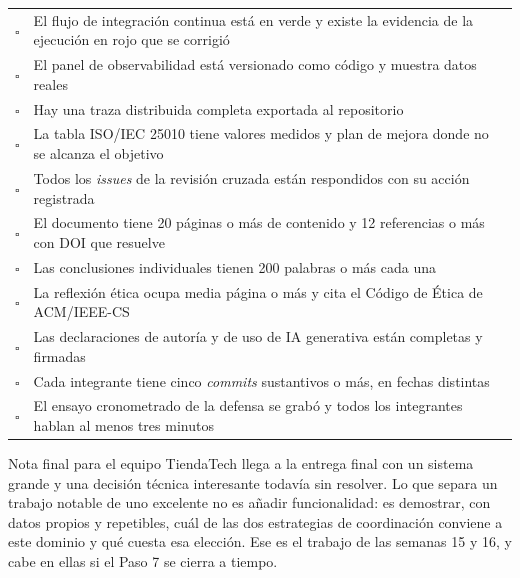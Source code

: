 \documentclass[11pt,a4paper]{article}
\begin{document}
\begin{center}
\begin{longtable}{@{}p{0.7cm}p{14.2cm}@{}}
			$\square$ & El flujo de integración continua está en verde y existe la evidencia de la ejecución en rojo que se corrigió \\
			$\square$ & El panel de observabilidad está versionado como código y muestra datos reales \\
			$\square$ & Hay una traza distribuida completa exportada al repositorio \\
			$\square$ & La tabla ISO/IEC 25010 tiene valores medidos y plan de mejora donde no se alcanza el objetivo \\
			$\square$ & Todos los \emph{issues} de la revisión cruzada están respondidos con su acción registrada \\
			$\square$ & El documento tiene 20 páginas o más de contenido y 12 referencias o más con DOI que resuelve \\
			$\square$ & Las conclusiones individuales tienen 200 palabras o más cada una \\
			$\square$ & La reflexión ética ocupa media página o más y cita el Código de Ética de ACM/IEEE-CS \\
			$\square$ & Las declaraciones de autoría y de uso de IA generativa están completas y firmadas \\
			$\square$ & Cada integrante tiene cinco \emph{commits} sustantivos o más, en fechas distintas \\
			$\square$ & El ensayo cronometrado de la defensa se grabó y todos los integrantes hablan al menos tres minutos \\
			\bottomrule
		\end{longtable}
	\end{center}
	
	\vspace{6pt}
	\begin{uteqbox}{Nota final para el equipo}
		TiendaTech llega a la entrega final con un sistema grande y una decisión técnica interesante todavía sin resolver. Lo que separa un trabajo notable de uno excelente no es añadir funcionalidad: es demostrar, con datos propios y repetibles, cuál de las dos estrategias de coordinación conviene a este dominio y qué cuesta esa elección. Ese es el trabajo de las semanas 15 y 16, y cabe en ellas si el Paso 7 se cierra a tiempo.
	\end{uteqbox}
	
\end{document}
